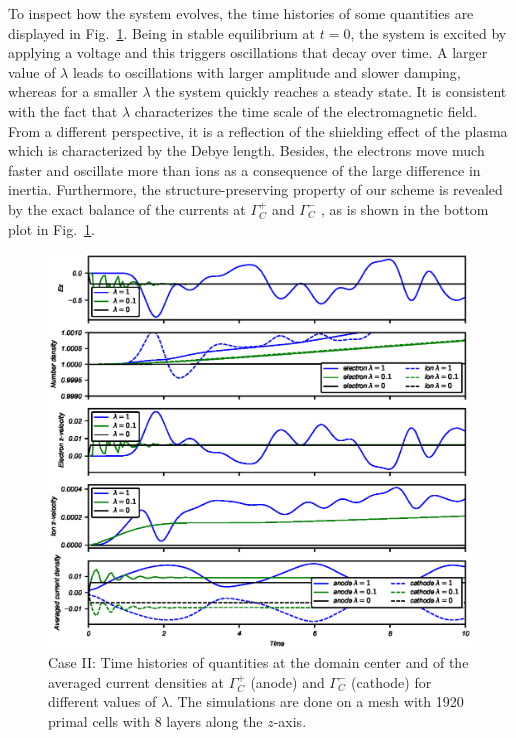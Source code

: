 \documentclass{article}
\begin{document}
To inspect how the system evolves, the time histories of some quantities are displayed in
Fig.~\ref{fig:origin-data_vs_time}. Being in stable equilibrium at $t=0$, the system is
excited by applying a voltage and this triggers oscillations that decay over time. A
larger value of $\lambda$ leads to oscillations with larger amplitude and slower damping,
whereas for a smaller $\lambda$ the system quickly reaches a steady state. It is
consistent with the fact that $\lambda$ characterizes the time scale of the
electromagnetic field. From a different perspective, it is a reflection of the shielding
effect of the plasma which is characterized by the Debye length. Besides, the electrons
move much faster and oscillate more than ions as a consequence of the large difference in
inertia. Furthermore, the structure-preserving property of our scheme is revealed by the
exact balance of the currents at $\Gamma^+_C$ and $\Gamma^-_C$ \cite{Hiptmair_2021}, as is
shown in the bottom plot in Fig.~\ref{fig:origin-data_vs_time}.

\begin{figure}
  \centering
    \includegraphics[scale=0.9]{data-vs-time_stepVoltage.eps}
    \caption{Case II: Time histories of quantities at the domain center and of the averaged current densities at $\Gamma^+_C$ (anode) and $\Gamma^-_C$ (cathode) for different values of $\lambda$. The simulations are done on a mesh with 1920 primal cells with 8 layers along the $z$-axis.}
    \label{fig:origin-data_vs_time}
\end{figure}
\end{document}
